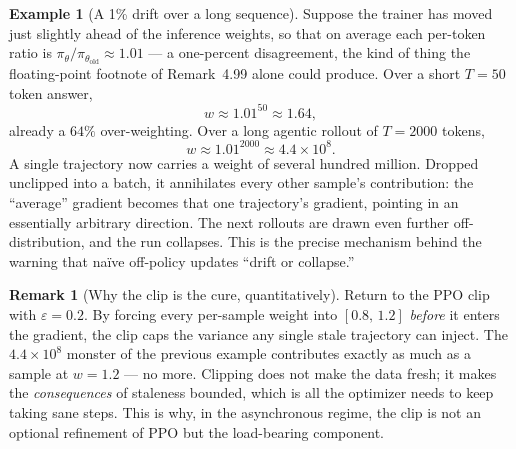 \documentclass[11pt,a4paper]{article}
\theoremstyle{definition}
\newtheorem{remark}[definition]{Remark}
\newtheorem{example}[definition]{Example}
\theoremstyle{plain}
\newcommand{\policy}{\pi_\theta}
\newcommand{\oldpolicy}{\pi_{\theta_{\text{old}}}}
\begin{document}
\begin{example}[A 1\% drift over a long sequence]
Suppose the trainer has moved just slightly ahead of the inference weights,
so that on average each per-token ratio is
$\policy/\oldpolicy \approx 1.01$ --- a one-percent disagreement, the kind of
thing the floating-point footnote of Remark~4.99 alone could produce.
Over a short $T=50$ token answer,
\[
  w \approx 1.01^{50} \approx 1.64,
\]
already a $64\%$ over-weighting. Over a long agentic rollout of
$T = 2000$ tokens,
\[
  w \approx 1.01^{2000} \approx 4.4 \times 10^{8}.
\]
A single trajectory now carries a weight of several hundred million. Dropped
unclipped into a batch, it annihilates every other sample's contribution: the
``average'' gradient becomes that one trajectory's gradient, pointing in an
essentially arbitrary direction. The next rollouts are drawn even further
off-distribution, and the run collapses. This is the precise mechanism behind
the warning that na\"ive off-policy updates ``drift or collapse.''
\end{example}

\begin{remark}[Why the clip is the cure, quantitatively]
Return to the PPO clip with $\varepsilon = 0.2$. By forcing every per-sample
weight into $[0.8,\,1.2]$ \emph{before} it enters the gradient, the clip
caps the variance any single stale trajectory can inject. The
$4.4\times10^{8}$ monster of the previous example contributes exactly as much
as a sample at $w = 1.2$ --- no more. Clipping does not make the data fresh;
it makes the \emph{consequences} of staleness bounded, which is all the
optimizer needs to keep taking sane steps. This is why, in the asynchronous
regime, the clip is not an optional refinement of PPO but the load-bearing
component.
\end{remark}
\end{document}
